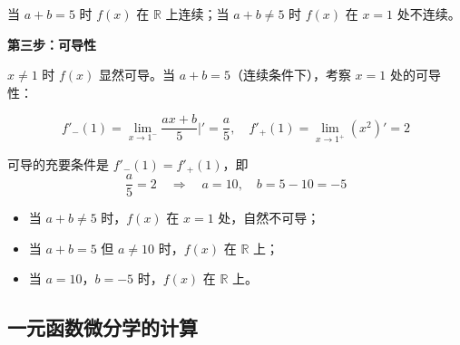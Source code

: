 \documentclass[./book.tex]{subfiles}
\begin{document}
\begin{analysisbox}[解]
        {\color{red}{结论：}}当 $a + b = 5$ 时 $f(x)$ 在 $\mathbb{R}$ 上连续；当 $a + b \neq 5$ 时 $f(x)$ 在 $x=1$ 处不连续。

        \medskip

        \textbf{第三步：可导性}

        $x \neq 1$ 时 $f(x)$ 显然可导。当 $a+b=5$（连续条件下），考察 $x=1$ 处的可导性：

        \[
            f'_-(1) = \lim_{x\to 1^-} \frac{ax+b}{5}\bigg|' = \frac{a}{5}, \quad
            f'_+(1) = \lim_{x\to 1^+} (x^2)' = 2
        \]

        可导的充要条件是 $f'_-(1) = f'_+(1)$，即
        \[
            \frac{a}{5} = 2 \quad\Longrightarrow\quad a = 10, \quad b = 5 - 10 = -5
        \]

        \medskip

        {\color{red}{综上：}}
        \begin{itemize}
            \item 当 $a + b \neq 5$ 时，$f(x)$ 在 $x=1$ 处{\color{red}{不连续}}，自然不可导；
            \item 当 $a + b = 5$ 但 $a \neq 10$ 时，$f(x)$ 在 $\mathbb{R}$ 上{\color{red}{连续但不可导}}；
            \item 当 $a = 10$，$b = -5$ 时，$f(x)$ 在 $\mathbb{R}$ 上{\color{red}{连续且可导}}。
        \end{itemize}
    \end{analysisbox}

    \subsection{一元函数微分学的计算}
\end{document}
